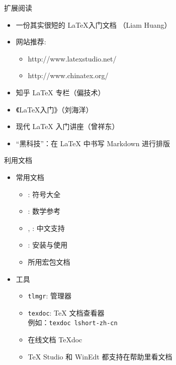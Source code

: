 \begin{frame}{扩展阅读}
  \begin{itemize}
    \item 一份其实很短的 \LaTeX 入门文档 （Liam Huang） 
    \item 网站推荐:
          \begin{itemize}
            \item http://www.latexstudio.net/
            \item http://www.chinatex.org/
          \end{itemize}
    \item 知乎 \LaTeX{} 专栏（偏技术）
    \item 《\LaTeX{}入门》（刘海洋）
    \item 现代 LaTeX 入门讲座（曾祥东）
    \item “黑科技”：在 \LaTeX{} 中书写 Markdown 进行排版 
  \end{itemize}
\end{frame}


\begin{frame}[fragile]{利用文档}
  \begin{itemize}
    \item 常用文档
          \begin{itemize}
            \item {}: 符号大全
            \item {}: 数学参考
            \item {}, : 中文支持
            \item {}: \TL 安装与使用
            \item 所用宏包文档
          \end{itemize}
    \item 工具
          \begin{itemize}
            \item \verb|tlmgr|: \TL 管理器
            \item \verb|texdoc|: \TeX{} 文档查看器\\
                  例如：\verb|texdoc lshort-zh-cn|
            \item 在线文档 \TeX{}doc 
            \item TeX Studio 和 WinEdt 都支持在帮助里看文档
          \end{itemize}
  \end{itemize}
\end{frame}

